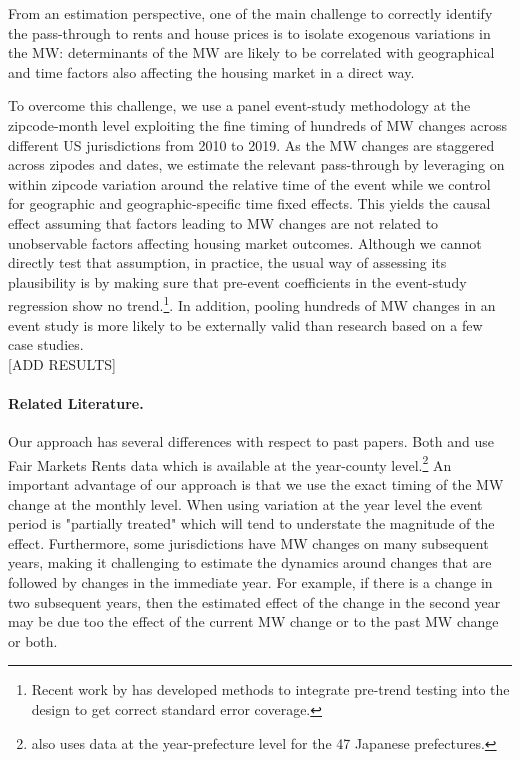 From an estimation perspective, one of the main challenge to correctly identify the pass-through to rents and house prices is to isolate exogenous variations in the MW: determinants of the MW are likely to be correlated with geographical and time factors also affecting the housing market in a direct way. 
 
To overcome this challenge, we use a panel event-study methodology \parencite{abraham2018estimating, BorusyakJaravel2017} at the zipcode-month level exploiting the fine timing of hundreds of MW changes across different US jurisdictions from 2010 to 2019. As the MW changes are staggered across zipodes and dates, we estimate the relevant pass-through by leveraging on within zipcode variation around the relative time of the event while we control for geographic and geographic-specific time fixed effects. This yields the causal effect assuming that factors leading to MW changes are not related to unobservable factors affecting housing market outcomes. Although we cannot directly test that assumption, in practice, the usual way of assessing its plausibility is by making sure that pre-event coefficients in the event-study regression show no trend.\footnote{Recent work by \textcite{roth2018pre} has developed methods to integrate pre-trend testing into the design to get correct standard error coverage.}. In addition, pooling hundreds of MW changes in an event study is more likely to be externally valid than research based on a few case studies. \\

[ADD RESULTS] \\

\paragraph{Related Literature.}
Our approach has several differences with respect to past papers. Both \textcite{tidemann2018mw} and \textcite{yamagishi2019minimum} use Fair Markets Rents data which is available at the year-county level.\footnote{\textcite{yamagishi2019minimum} also uses data at the year-prefecture level for the 47 Japanese prefectures.} An important advantage of our approach is that we use the exact timing of the MW change at the monthly level. When using variation at the year level the event period is "partially treated" which will tend to understate the magnitude of the effect. Furthermore, some jurisdictions have MW changes on many subsequent years, making it challenging to estimate the dynamics around changes that are followed by changes in the immediate year. For example, if there is a change in two subsequent years, then the estimated effect of the change in the second year may be due too the effect of the current MW change or to the past MW change or both.


